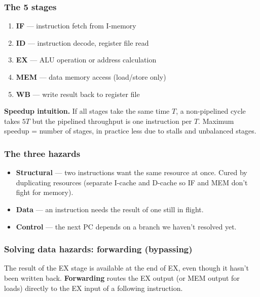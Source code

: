 \documentclass[11pt,a4paper]{article}
\begin{document}
\subsubsection*{The 5 stages}

\begin{enumerate}[leftmargin=*,itemsep=0pt]
  \item \textbf{IF} --- instruction fetch from I-memory
  \item \textbf{ID} --- instruction decode, register file read
  \item \textbf{EX} --- ALU operation or address calculation
  \item \textbf{MEM} --- data memory access (load/store only)
  \item \textbf{WB} --- write result back to register file
\end{enumerate}

\textbf{Speedup intuition.} If all stages take the same time $T$, a non-pipelined cycle takes $5T$ but the pipelined throughput is one instruction per $T$. Maximum speedup = number of stages, in practice less due to stalls and unbalanced stages.

\subsubsection*{The three hazards}

\begin{itemize}[leftmargin=*,itemsep=1pt]
  \item \textbf{Structural} --- two instructions want the same resource at once. Cured by duplicating resources (separate I-cache and D-cache so IF and MEM don't fight for memory).
  \item \textbf{Data} --- an instruction needs the result of one still in flight.
  \item \textbf{Control} --- the next PC depends on a branch we haven't resolved yet.
\end{itemize}

\subsubsection*{Solving data hazards: forwarding (bypassing)}

The result of the EX stage is available at the end of EX, even though it hasn't been written back. \textbf{Forwarding} routes the EX output (or MEM output for loads) directly to the EX input of a following instruction.
\end{document}
